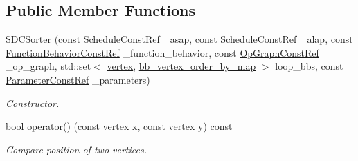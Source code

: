 \subsection*{Public Member Functions}
\begin{DoxyCompactItemize}
\item 
\hyperlink{classSDCSorter_ac147ee06edf66d529a7cf9547aedd233}{S\+D\+C\+Sorter} (const \hyperlink{schedule_8hpp_a85e4dea8a1611026193d8ca13fc5a260}{Schedule\+Const\+Ref} \+\_\+asap, const \hyperlink{schedule_8hpp_a85e4dea8a1611026193d8ca13fc5a260}{Schedule\+Const\+Ref} \+\_\+alap, const \hyperlink{function__behavior_8hpp_a94872da12ed056b6ecf90456164e0213}{Function\+Behavior\+Const\+Ref} \+\_\+function\+\_\+behavior, const \hyperlink{op__graph_8hpp_a9a0b240622c47584bee6951a6f5de746}{Op\+Graph\+Const\+Ref} \+\_\+op\+\_\+graph, std\+::set$<$ \hyperlink{graph_8hpp_abefdcf0544e601805af44eca032cca14}{vertex}, \hyperlink{classbb__vertex__order__by__map}{bb\+\_\+vertex\+\_\+order\+\_\+by\+\_\+map} $>$ loop\+\_\+bbs, const \hyperlink{Parameter_8hpp_a37841774a6fcb479b597fdf8955eb4ea}{Parameter\+Const\+Ref} \+\_\+parameters)
\begin{DoxyCompactList}\small\item\em Constructor. \end{DoxyCompactList}\item 
bool \hyperlink{classSDCSorter_a4829b20e9992b79a4c086a6d50415ed8}{operator()} (const \hyperlink{graph_8hpp_abefdcf0544e601805af44eca032cca14}{vertex} x, const \hyperlink{graph_8hpp_abefdcf0544e601805af44eca032cca14}{vertex} y) const
\begin{DoxyCompactList}\small\item\em Compare position of two vertices. \end{DoxyCompactList}\end{DoxyCompactItemize}
